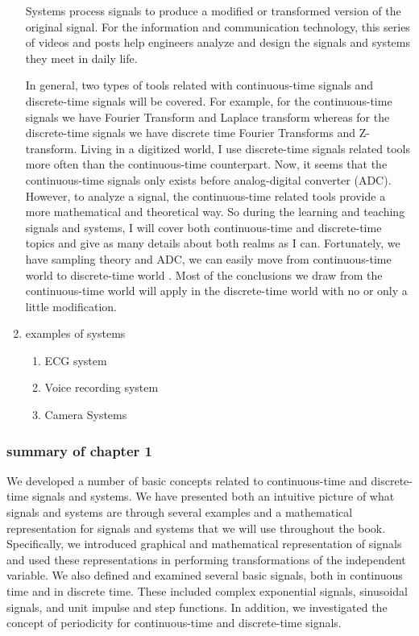 \documentclass[koma,utopia,letterpaper,captions=tableheading,11pt,listings-sv,microtype,paralist,colorlinks=true,urlcolor=blue]{org-article}
\begin{document}
\begin{enumerate}
Systems process signals to produce a modified or transformed version of the
original signal. For the information and communication technology, this series
of videos and posts help engineers analyze and design the signals and systems
they meet in daily life.

In general, two types of tools related with continuous-time signals and
discrete-time signals will be covered. For example, for the continuous-time
signals we have Fourier Transform and Laplace transform whereas for the
discrete-time signals we have discrete time Fourier Transforms and Z-transform.
Living in a digitized world, I use discrete-time signals related tools more
often than the continuous-time counterpart. Now, it seems that the
continuous-time signals only exists before analog-digital converter (ADC).
However, to analyze a signal, the continuous-time related tools provide a more
mathematical and theoretical way. So during the learning and teaching signals
and systems, I will cover both continuous-time and discrete-time topics and give
as many details about both realms as I can. Fortunately, we have sampling theory
and ADC, we can easily move from continuous-time world to discrete-time world .
Most of the conclusions we draw from the continuous-time world will apply in the
discrete-time world with no or only a little modification.
\item examples of systems
\label{sec:org4f5abb0}


\begin{enumerate}
\item ECG system
\label{sec:org705072e}

\item Voice recording system
\label{sec:orga139225}

\item Camera Systems
\label{sec:org0ec4a51}
\end{enumerate}
\end{enumerate}

\subsubsection{summary of chapter 1}
\label{sec:org9c0f4d4}


We developed a number of basic concepts related to continuous-time and
discrete-time signals and systems. We have presented both an intuitive picture
of what signals and systems are through several examples and a mathematical
representation for signals and systems that we will use throughout the book.
Specifically, we introduced graphical and mathematical representation of signals
and used these representations in performing transformations of the independent
variable. We also defined and examined several basic signals, both in continuous
time and in discrete time. These included complex exponential signals,
sinusoidal signals, and unit impulse and step functions. In addition, we
investigated the concept of periodicity for continuous-time and discrete-time
signals.
\end{document}
